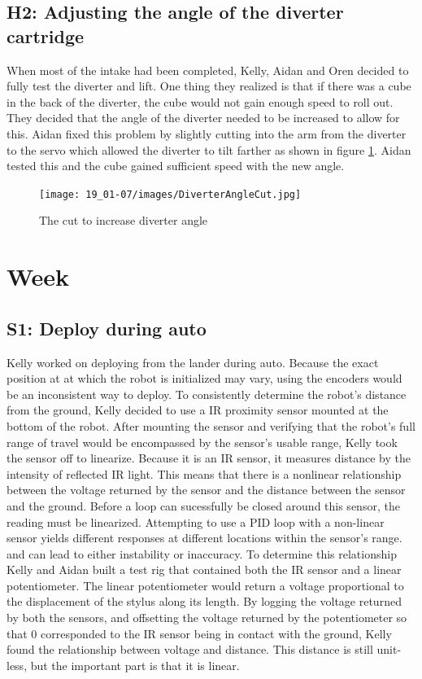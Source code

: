 \documentclass{article}
\begin{document}
\subsection{H2: Adjusting the angle of the diverter cartridge}

When most of the intake had been completed, Kelly, Aidan and Oren decided to fully test the diverter and lift. One thing they realized is that if there was a cube in the back of the diverter, the cube would not gain enough speed to roll out. They decided that the angle of the diverter needed to be increased to allow for this. Aidan fixed this problem by slightly cutting into the arm from the diverter to the servo which allowed the diverter to tilt farther as shown in figure \ref{fig:Cutout}. Aidan tested this and the cube gained sufficient speed with the new angle.

\begin{figure}
    \centering
    \texttt{[image: 19\_01-07/images/DiverterAngleCut.jpg]}
    \caption{The cut to increase diverter angle}
    \label{fig:Cutout}
\end{figure}
\clearpage \newpage \section{Week \thesection} 
\subsection{S1: Deploy during auto}

Kelly worked on deploying from the lander during auto. Because the exact position at at which the robot is initialized may vary, using the encoders would be an inconsistent way to deploy. To consistently determine the robot's distance from the ground, Kelly decided to use a IR proximity sensor mounted at the bottom of the robot. After mounting the sensor and verifying that the robot's full range of travel would be encompassed by the sensor's usable range, Kelly took the sensor off to linearize. Because it is an IR sensor, it measures distance by the intensity of reflected IR light. This means that there is a nonlinear relationship between the voltage returned by the sensor and the distance between the sensor and the ground. Before a loop can sucessfully be closed around this sensor, the reading must be linearized. Attempting to use a PID loop with a non-linear sensor yields different responses at different locations within the sensor's range. and can lead to either instability or inaccuracy. To determine this relationship Kelly and Aidan built a test rig that contained both the IR sensor and a linear potentiometer. The linear potentiometer would return a voltage proportional to the displacement of the stylus along its length. By logging the voltage returned by both the sensors, and offsetting the voltage returned by the potentiometer so that 0 corresponded to the IR sensor being in contact with the ground, Kelly found the relationship between voltage and distance. This distance is still unit-less, but the important part is that it is linear.
\end{document}
